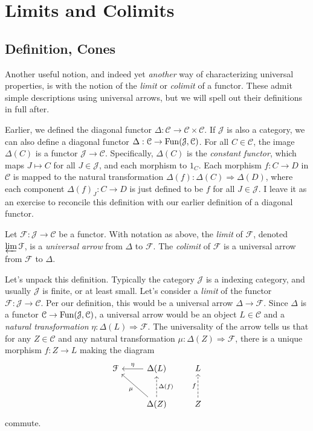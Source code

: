\section{Limits and Colimits}

\subsection{Definition, Cones}

Another useful notion, and indeed yet \emph{another} way of characterizing universal properties, is with the notion of the \emph{limit} or \emph{colimit} of a functor. These admit simple descriptions using universal arrows, but we will spell out their definitions in full after.

Earlier, we defined the diagonal functor $\Delta : \mathcal{C}  \to \mathcal{C} \times \mathcal{C} $. If $\mathcal{J} $ is also a category, we can also define a diagonal functor $\Delta : \mathcal{C}  \to \operatorname{Fun}(\mathcal{J} ,\mathcal{C} )$. For all $C\in \mathcal{C} $, the image $\Delta (C)$ is a functor $\mathcal{J}  \to \mathcal{C} $. Specifically, $\Delta (C)$ is the \emph{constant functor}, which maps $J\mapsto C$ for all $J\in \mathcal{J} $, and each morphism to $1_C$. Each morphism $f : C \to D$ in $\mathcal{C} $ is mapped to the natural transformation $\Delta (f): \Delta (C) \Rightarrow \Delta (D)$, where each component $\Delta (f)_J : C \to D$ is just defined to be $f$ for all $J\in \mathcal{J} $. I leave it as an exercise to reconcile this definition with our earlier definition of a diagonal functor.

\begin{definition}\label{dfn:9}
	Let $\mathcal{F} : \mathcal{J}  \to \mathcal{C} $ be a functor. With notation as above, the \emph{limit} of $\mathcal{F} $, denoted $\varprojlim \mathcal{F} $, is a \emph{universal arrow} from $\Delta  $ to $\mathcal{F} $. The \emph{colimit} of $\mathcal{F} $ is a universal arrow from $\mathcal{F} $ to $\Delta $.
\end{definition}

Let's unpack this definition. Typically the category $\mathcal{J} $ is a indexing category, and usually $\mathcal{J} $ is finite, or at least small. Let's consider a \emph{limit} of the functor $\mathcal{F} : \mathcal{J}  \to \mathcal{C} $. Per our definition, this would be a universal arrow $\Delta \to \mathcal{F} $. Since $\Delta $ is a functor $\mathcal{C} \to \operatorname{Fun}(\mathcal{J} ,\mathcal{C} )$, a universal arrow would be an object $L\in \mathcal{C} $ and a \emph{natural transformation} $\eta : \Delta (L)  \Rightarrow \mathcal{F} $. The universality of the arrow tells us that for any $Z\in \mathcal{C} $ and any natural transformation $\mu :\Delta (Z)\Rightarrow \mathcal{F} $, there is a unique morphism $f:Z\to L$ making the diagram
\[\begin{tikzcd}[row sep = 2.5em, column sep = 2.5em]
\mathcal{F}  & \Delta (L)\ar[" \eta  "', l]  & L \\
 & \Delta (Z)\ar[dashed, u, " \Delta (f) "'] \ar[ul, " \mu  "]  & Z\ar[dashed, u, " f "] 
\end{tikzcd}\]
commute.

